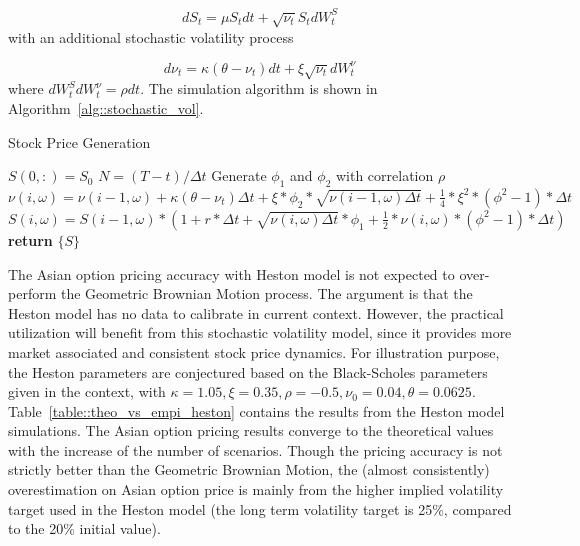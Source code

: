 \documentclass[a4paper,11pt] {article}
\begin{document}
$$
dS_t = \mu S_t dt + \sqrt{\nu_t} S_t d W_t^S
$$
with an additional stochastic volatility process

$$
d\nu_t = \kappa(\theta - \nu_t) dt + \xi \sqrt{\nu_t} d W_t^\nu
$$
where $d W_t^S d W_t^\nu = \rho dt$. The simulation algorithm is shown in Algorithm~\ref{alg::stochastic_vol}.

\begin{algorithm}
\caption{Stock Price Generation}\label{alg::stochastic_vol}
\begin{algorithmic}[1]
\State $S(0,:) = S_0$
\State $N = (T-t)/\Delta t$ 
    
\State Generate $\phi_1$ and $\phi_2$ with correlation $\rho$
\State $\nu(i,\omega)= \nu(i-1,\omega)  + \kappa(\theta - \nu_t) \Delta t + \xi * \phi_2 * \sqrt{\nu(i-1,\omega) \Delta t} + \frac{1}{4} * \xi^2 *(\phi^2-1)*\Delta t$
\State $S(i,\omega)= S(i-1,\omega) * (1 + r * \Delta t + \sqrt{\nu(i,\omega) \Delta t} * \phi_1 + \frac{1}{2} * \nu(i,\omega) *(\phi^2-1)*\Delta t)$
\EndFor
\EndFor %
\State \textbf{return} $\{S\}$  %
\EndProcedure
\end{algorithmic}
\end{algorithm}

The Asian option pricing accuracy with Heston model is not expected to over-perform the Geometric Brownian Motion process. The argument is that the Heston model has no data to calibrate in current context. However, the practical utilization will benefit from this stochastic volatility model, since it provides more market associated and consistent stock price dynamics. For illustration purpose, the Heston parameters are conjectured based on the Black-Scholes parameters given in the context, with $\kappa = 1.05, \xi = 0.35, \rho = -0.5, \nu_0 = 0.04, \theta=0.0625$. Table~\ref{table::theo_vs_empi_heston} contains the results from the Heston model simulations. The Asian option pricing results converge to the theoretical values with the increase of the number of scenarios. Though the pricing accuracy is not strictly better than the Geometric Brownian Motion, the (almost consistently) overestimation on Asian option price is mainly from the higher implied volatility target used in the Heston model (the long term volatility target is 25\%, compared to the 20\% initial value).
\end{document}
